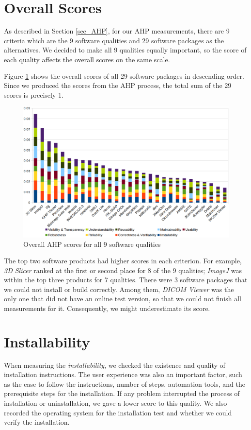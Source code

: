 \section{Overall Scores}

As described in Section \ref{sec_AHP}, for our AHP measurements, there are 9 criteria which are the 9 software qualities and 29 software packages as the alternatives. We decided to make all 9 qualities equally important, so the score of each quality affects the overall scores on the same scale.

Figure \ref{fg_overall_scores} shows the overall scores of all 29 software packages in descending order. Since we produced the scores from the AHP process, the total sum of the 29 scores is precisely 1.

\begin{figure}[H]
\includegraphics[scale=0.35]{figures/overall_scores.png}
\caption{Overall AHP scores for all 9 software qualities}
\label{fg_overall_scores}
\end{figure}

The top two software products had higher scores in each criterion. For example, \textit{3D Slicer} \cite{Kikinis2014} ranked at the first or second place for 8 of the 9 qualities; \textit{ImageJ} \cite{Rueden2017} was within the top three products for 7 qualities. There were 3 software packages that we
could not install or build correctly. Among them, \textit{DICOM Viewer} \cite{Afsar2021} was the only one that did not have an online test version, so that we could not finish all measurements for it. Consequently, we might underestimate its score.

\section{Installability}
\label{sec_result_installability}
When measuring the \textit{installability}, we checked the existence and quality of installation instructions. The user experience was also an important factor, such as the ease to follow the instructions, number of steps, automation tools, and the prerequisite steps for the installation. If any problem interrupted the process of installation or uninstallation, we gave a lower score to this quality. We also recorded the operating system for the installation test and whether we could verify the installation.

